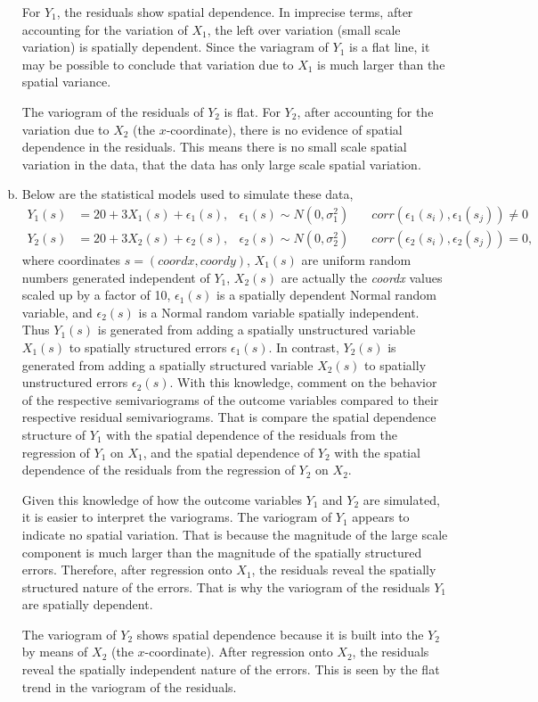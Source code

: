 \documentclass[letterpaper, 12pt]{article}\usepackage[]{graphicx}\usepackage[]{color}
\newenvironment{knitrout}{}{} %
\begin{document}
\begin{enumerate}[(a)]
\begin{knitrout}
\end{knitrout}


{\sf
For $Y_1$, the residuals show spatial dependence. In imprecise terms, after accounting for the variation of $X_1$, the left over variation (small scale variation) is spatially dependent. Since the variagram of $Y_1$ is a flat line, it may be possible to conclude that variation due to $X_1$ is much larger than the spatial variance.

The variogram of the residuals of $Y_2$ is flat. For $Y_2$, after accounting for the variation due to $X_2$ (the $x$-coordinate), there is no evidence of spatial dependence in the residuals. This means there is no small scale spatial variation in the data, that the data has only large scale spatial variation.
}


\item
Below are the statistical models used to simulate these data,
\begin{align*}
Y_1(s) 
&= 20+3X_1(s)+\epsilon_1(s), 
&\epsilon_1(s)\sim N(0,\sigma_1^2) 
\quad
& corr(\epsilon_1(s_i),\epsilon_1(s_j)) \neq 0
\\
Y_2(s) 
&= 20+3X_2(s)+\epsilon_2(s), 
&\epsilon_2(s)\sim N(0,\sigma_2^2) 
\quad
& corr(\epsilon_2(s_i),\epsilon_2(s_j)) = 0,
\end{align*}
where coordinates $s = (coordx, coordy)$, $X_1(s)$ are uniform random numbers generated independent of $Y_1$, $X_2(s)$ are actually the \textit{coordx} values scaled up by a factor of 10, $\epsilon_1(s)$ is a spatially dependent Normal random variable, and $\epsilon_2(s)$ is a Normal random variable spatially independent. Thus $Y_1(s)$ is generated from adding a spatially unstructured variable $X_1(s)$ to spatially structured errors $\epsilon_1(s)$. In contrast, $Y_2(s)$ is generated from adding a spatially structured variable $X_2(s)$ to spatially unstructured errors $\epsilon_2(s)$. With this knowledge, comment on the behavior of the respective semivariograms of the outcome variables compared to their respective residual semivariograms. That is compare the spatial dependence structure of $Y_1$ with the spatial dependence of the residuals from the regression of $Y_1$ on $X_1$, and the spatial dependence of $Y_2$ with the spatial dependence of the residuals from the regression of $Y_2$ on $X_2$.

{\sf
Given this knowledge of how the outcome variables $Y_1$ and $Y_2$ are simulated, it is easier to interpret the variograms. The variogram of $Y_1$ appears to indicate no spatial variation. That is because the magnitude of the large scale component is much larger than the magnitude of the spatially structured errors. Therefore, after regression onto $X_1$, the residuals reveal the spatially structured nature of the errors. That is why the variogram of the residuals $Y_1$ are spatially dependent.

The variogram of $Y_2$ shows spatial dependence because it is built into the $Y_2$ by means of $X_2$ (the $x$-coordinate). After regression onto $X_2$, the residuals reveal the spatially independent nature of the errors. This is seen by the flat trend in the variogram of the residuals.
}
\end{enumerate}
\end{document}
